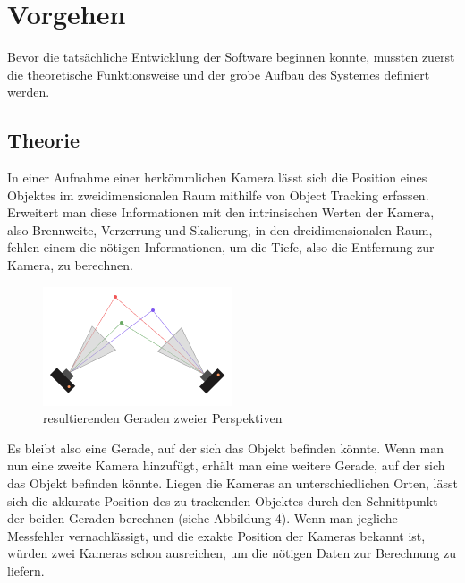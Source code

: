 \documentclass[12pt, ngerman]{article}
\begin{document}
\section{Vorgehen}
Bevor die tatsächliche Entwicklung der Software beginnen konnte, mussten zuerst die theoretische Funktionsweise und der grobe Aufbau des Systemes definiert werden.

\subsection{Theorie}
In einer Aufnahme einer herkömmlichen Kamera lässt sich die Position eines Objektes im zweidimensionalen Raum mithilfe von Object Tracking erfassen. Erweitert man diese Informationen mit den intrinsischen Werten der Kamera, also Brennweite, Verzerrung und Skalierung, in den dreidimensionalen Raum, fehlen einem die nötigen Informationen, um die Tiefe, also die Entfernung zur Kamera, zu berechnen.  

\begin{figure}
\centering
  \includegraphics[angle=0,width=\linewidth]{triangulation.png}
  \caption{resultierenden Geraden zweier Perspektiven}
\end{figure}
Es bleibt also eine Gerade, auf der sich das Objekt befinden könnte. Wenn man nun eine zweite Kamera hinzufügt, erhält man eine weitere Gerade, auf der sich das Objekt befinden könnte. Liegen die Kameras an unterschiedlichen Orten, lässt sich die akkurate Position des zu trackenden Objektes durch den Schnittpunkt der beiden Geraden berechnen (siehe Abbildung 4). Wenn man jegliche Messfehler vernachlässigt, und die exakte Position der Kameras bekannt ist, würden zwei Kameras schon ausreichen, um die nötigen Daten zur Berechnung zu liefern.  
\end{document}
